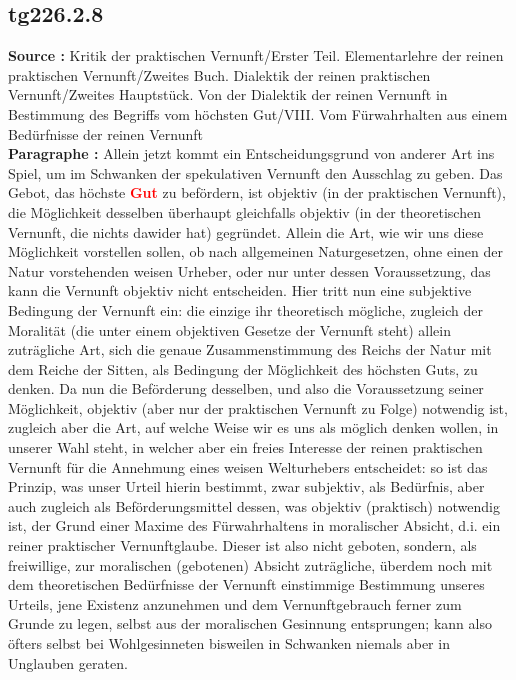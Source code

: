 \documentclass[a4paper,12pt,twoside]{book}
\newcommand{\match}[1]{\textcolor{red}{\textbf{#1}}}
\begin{document}
	\subsection*{tg226.2.8} 
	\textbf{Source : }Kritik der praktischen Vernunft/Erster Teil. Elementarlehre der reinen praktischen Vernunft/Zweites Buch. Dialektik der reinen praktischen Vernunft/Zweites Hauptstück. Von der Dialektik der reinen Vernunft in Bestimmung des Begriffs vom höchsten Gut/VIII. Vom Fürwahrhalten aus einem Bedürfnisse der reinen Vernunft\\  
	
	\textbf{Paragraphe : }Allein jetzt kommt ein Entscheidungsgrund von anderer Art ins Spiel, um im Schwanken der spekulativen Vernunft den Ausschlag zu geben. Das Gebot, das höchste \match{Gut} zu befördern, ist objektiv (in der praktischen Vernunft), die Möglichkeit desselben überhaupt gleichfalls objektiv (in der theoretischen Vernunft, die nichts dawider hat) gegründet. Allein die Art, wie wir uns diese Möglichkeit vorstellen sollen, ob nach allgemeinen Naturgesetzen, ohne einen der Natur vorstehenden weisen Urheber, oder nur unter dessen Voraussetzung, das kann die Vernunft objektiv nicht entscheiden. Hier tritt nun eine subjektive Bedingung der Vernunft ein: die einzige ihr theoretisch mögliche, zugleich der Moralität (die unter einem objektiven Gesetze der Vernunft steht) allein zuträgliche Art, sich die genaue Zusammenstimmung des Reichs der Natur mit dem Reiche der Sitten, als Bedingung der Möglichkeit des höchsten Guts, zu denken. Da nun die Beförderung desselben, und also die Voraussetzung seiner Möglichkeit, objektiv (aber nur der praktischen Vernunft zu Folge) notwendig ist, zugleich aber die Art, auf welche Weise wir es uns als möglich denken wollen, in unserer Wahl steht, in welcher aber ein freies Interesse der reinen praktischen Vernunft für die Annehmung eines weisen Welturhebers entscheidet: so ist das Prinzip, was unser Urteil hierin bestimmt, zwar subjektiv, als Bedürfnis, aber auch zugleich als Beförderungsmittel dessen, was objektiv (praktisch) notwendig ist, der Grund einer Maxime des Fürwahrhaltens in moralischer Absicht, d.i. ein reiner praktischer Vernunftglaube. Dieser ist also nicht geboten, sondern, als freiwillige, zur moralischen (gebotenen) Absicht zuträgliche, überdem noch mit dem theoretischen Bedürfnisse der Vernunft einstimmige Bestimmung unseres Urteils, jene Existenz anzunehmen  und dem Vernunftgebrauch ferner zum Grunde zu legen, selbst aus der moralischen Gesinnung entsprungen; kann also öfters selbst bei Wohlgesinneten bisweilen in Schwanken niemals aber in Unglauben geraten. 
	
\end{document}
